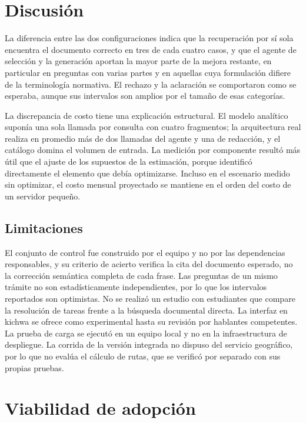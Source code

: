 \documentclass[conference]{IEEEtran}
\begin{document}
\section{Discusión}
\label{sec:discussion}

La diferencia entre las dos configuraciones indica que la recuperación por sí sola encuentra el documento correcto en tres de cada cuatro casos, y que el agente de selección y la generación aportan la mayor parte de la mejora restante, en particular en preguntas con varias partes y en aquellas cuya formulación difiere de la terminología normativa. El rechazo y la aclaración se comportaron como se esperaba, aunque sus intervalos son amplios por el tamaño de esas categorías.

La discrepancia de costo tiene una explicación estructural. El modelo analítico suponía una sola llamada por consulta con cuatro fragmentos; la arquitectura real realiza en promedio más de dos llamadas del agente y una de redacción, y el catálogo domina el volumen de entrada. La medición por componente resultó más útil que el ajuste de los supuestos de la estimación, porque identificó directamente el elemento que debía optimizarse. Incluso en el escenario medido sin optimizar, el costo mensual proyectado se mantiene en el orden del costo de un servidor pequeño.

\subsection{Limitaciones}
El conjunto de control fue construido por el equipo y no por las dependencias responsables, y su criterio de acierto verifica la cita del documento esperado, no la corrección semántica completa de cada frase. Las preguntas de un mismo trámite no son estadísticamente independientes, por lo que los intervalos reportados son optimistas. No se realizó un estudio con estudiantes que compare la resolución de tareas frente a la búsqueda documental directa. La interfaz en kichwa se ofrece como experimental hasta su revisión por hablantes competentes. La prueba de carga se ejecutó en un equipo local y no en la infraestructura de despliegue. La corrida de la versión integrada no dispuso del servicio geográfico, por lo que no evalúa el cálculo de rutas, que se verificó por separado con sus propias pruebas.

\section{Viabilidad de adopción}
\label{sec:adoption}
\end{document}
